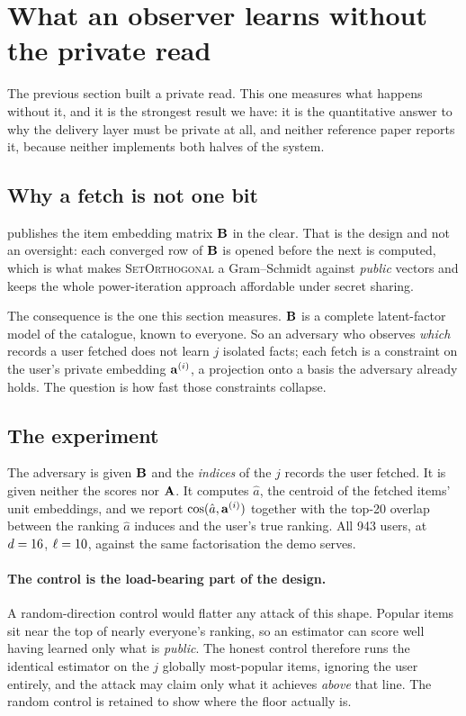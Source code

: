 \section{What an observer learns without the private read}
\label{sec:tech:leakage}

The previous section built a private read. This one measures what happens
without it, and it is the strongest result we have: it is the quantitative
answer to why the delivery layer must be private at all, and neither reference
paper reports it, because neither implements both halves of the system.

\subsection{Why a fetch is not one bit}
\label{sec:tech:leakage:why}

\nudgeplain{} publishes the item embedding matrix $\mathbf{B}$ in the clear.
That is the design and not an oversight: each converged row of $\mathbf{B}$ is
opened before the next is computed, which is what makes \textsc{SetOrthogonal}
a Gram--Schmidt against \emph{public} vectors and keeps the whole
power-iteration approach affordable under secret sharing.

The consequence is the one this section measures. $\mathbf{B}$ is a complete
latent-factor model of the catalogue, known to everyone. So an adversary who
observes \emph{which} records a user fetched does not learn $j$ isolated facts;
each fetch is a constraint on the user's private embedding $\mathbf{a}^{(i)}$, a
projection onto a basis the adversary already holds. The question is how fast
those constraints collapse.

\subsection{The experiment}
\label{sec:tech:leakage:setup}

The adversary is given $\mathbf{B}$ and the \emph{indices} of the $j$ records
the user fetched. It is given neither the scores nor $\mathbf{A}$. It computes
$\hat{a}$, the centroid of the fetched items' unit embeddings, and we report
$\cos(\hat{a}, \mathbf{a}^{(i)})$ together with the top-20 overlap between the ranking
$\hat{a}$ induces and the user's true ranking. All 943 users, at
$d = 16$, $\ell = 10$, against the same factorisation the demo serves.

\paragraph{The control is the load-bearing part of the design.} A
random-direction control would flatter any attack of this shape. Popular items
sit near the top of nearly everyone's ranking, so an estimator can score well
having learned only what is \emph{public}. The honest control therefore runs
the identical estimator on the $j$ globally most-popular items, ignoring the
user entirely, and the attack may claim only what it achieves \emph{above} that
line. The random control is retained to show where the floor actually is.


